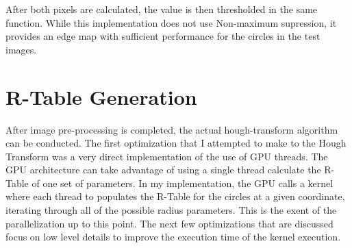 \documentclass[conference]{IEEEtran}
\begin{document}
After both pixels are calculated, the value is then thresholded in the same function. While this implementation does not use Non-maximum supression, it provides an edge map with sufficient performance for the circles in the test images. 

\section{R-Table Generation}
After image pre-processing is completed, the actual hough-transform algorithm can be conducted. 
The first optimization that I attempted to make to the Hough Transform was a very direct implementation of the use of GPU threads. 
The GPU architecture can take advantage of using a single thread calculate the R-Table of one set of parameters. 
In my implementation, the GPU calls a kernel where each thread to populates the R-Table for the circles at a given coordinate, iterating through all of the possible radius parameters.
This is the exent of the parallelization up to this point. 
The next few optimizations that are discussed focus on low level details to improve the execution time of the kernel execution. 
\end{document}
